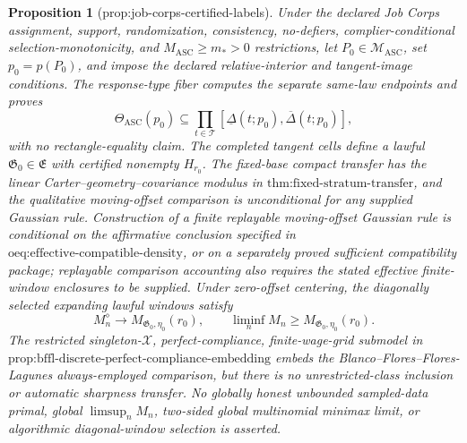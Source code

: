 \documentclass{article}
\newtheorem{proposition}{Proposition}
\begin{document}
\begin{proposition}[prop:job-corps-certified-labels]\label{prop:job-corps-certified-labels}
Under the declared Job Corps assignment, support, randomization, consistency, no-defiers, complier-conditional selection-monotonicity, and \(M_{\mathrm{ASC}}\ge m_*>0\) restrictions, let \(P_0\in\mathcal M_{\mathrm{ASC}}\), set \(p_0=p(P_0)\), and impose the declared relative-interior and tangent-image conditions.  The response-type fiber computes the separate same-law endpoints and proves
\[
\Theta_{\mathrm{ASC}}(p_0)
\subseteq\prod_{t\in\mathcal T}
[\underline\Delta(t;p_0),\overline\Delta(t;p_0)],
\]
with no rectangle-equality claim.  The completed tangent cells define a lawful \(\mathfrak G_0\in\mathfrak E\) with certified nonempty \(H_{r_0}\).  The fixed-base compact transfer has the linear Carter--geometry--covariance modulus in \(\text{thm:fixed-stratum-transfer}\), and the qualitative moving-offset comparison is unconditional for any supplied Gaussian rule.  Construction of a finite replayable moving-offset Gaussian rule is conditional on the affirmative conclusion specified in \(\text{oeq:effective-compatible-density}\), or on a separately proved sufficient compatibility package; replayable comparison accounting also requires the stated effective finite-window enclosures to be supplied.  Under zero-offset centering, the diagonally selected expanding lawful windows satisfy
\[
M_n^{\diamond}\to M_{\mathfrak G_0,\eta_0}(r_0),
\qquad
\liminf_nM_n\ge M_{\mathfrak G_0,\eta_0}(r_0).
\]
The restricted singleton-\(\mathcal X\), perfect-compliance, finite-wage-grid submodel in \(\text{prop:bffl-discrete-perfect-compliance-embedding}\) embeds the Blanco--Flores--Flores-Lagunes always-employed comparison, but there is no unrestricted-class inclusion or automatic sharpness transfer.  No globally honest unbounded sampled-data primal, global \(\limsup_nM_n\), two-sided global multinomial minimax limit, or algorithmic diagonal-window selection is asserted.
\end{proposition}
\end{document}
